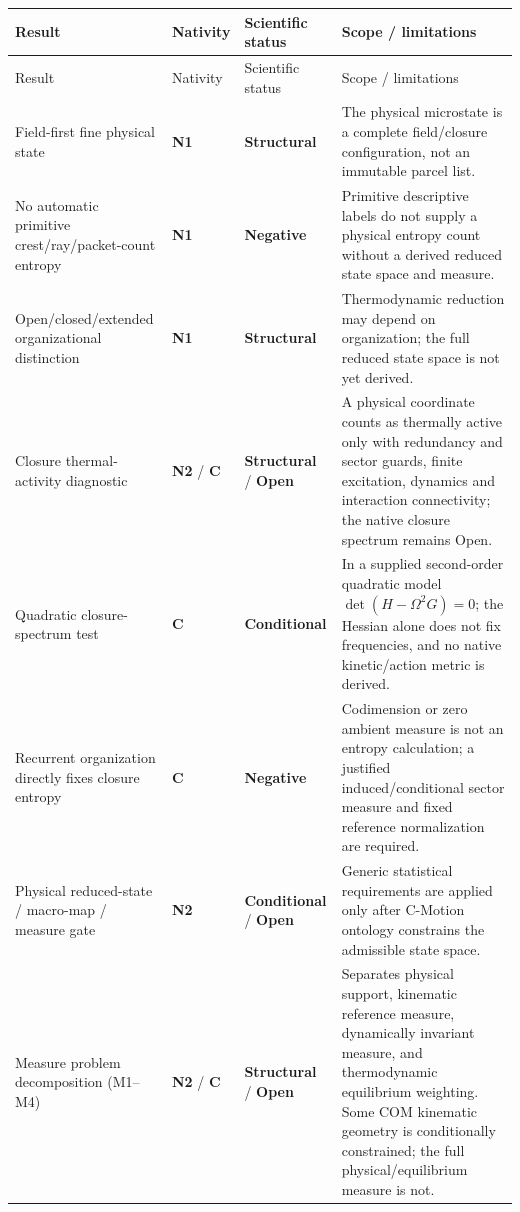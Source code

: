 \documentclass[11pt]{article}
\theoremstyle{definition}
\newcommand{\cmotion}{\mbox{C-Motion}}
\newcommand{\statusStructural}{\textcolor{blue!55!black}{\textbf{Structural}}}
\newcommand{\statusConditional}{\textcolor{yellow!60!black}{\textbf{Conditional}}}
\newcommand{\statusOpen}{\textcolor{red!75!black}{\textbf{Open}}}
\newcommand{\statusNegative}{\textcolor{red!65!black}{\textbf{Negative}}}
\newcommand{\natNOne}{\textcolor{blue!70!black}{\textbf{N1}}}
\newcommand{\natNTwo}{\textcolor{teal!70!black}{\textbf{N2}}}
\newcommand{\natControl}{\textcolor{gray!75!black}{\textbf{C}}}
\begin{document}
\begin{center}
\footnotesize
\renewcommand{\arraystretch}{1.20}
\begin{longtable}{@{}P{3.5cm}P{1.7cm}P{2.5cm}P{5.6cm}@{}}
\toprule
Result & Nativity & Scientific status & Scope / limitations \\
\midrule
\endfirsthead
\toprule
Result & Nativity & Scientific status & Scope / limitations \\
\midrule
\endhead
Field-first fine physical state
& \natNOne{} & \statusStructural{}
& The physical microstate is a complete field/closure configuration, not an immutable parcel list. \\
No automatic primitive crest/ray/packet-count entropy
& \natNOne{} & \statusNegative{}
& Primitive descriptive labels do not supply a physical entropy count without a derived reduced state space and measure. \\
Open/closed/extended organizational distinction
& \natNOne{} & \statusStructural{}
& Thermodynamic reduction may depend on organization; the full reduced state space is not yet derived. \\
Closure thermal-activity diagnostic
& \natNTwo{} / \natControl{} & \statusStructural{} / \statusOpen{}
& A physical coordinate counts as thermally active only with redundancy and sector guards, finite excitation, dynamics and interaction connectivity; the native closure spectrum remains Open. \\
Quadratic closure-spectrum test
& \natControl{} & \statusConditional{}
& In a supplied second-order quadratic model $\det(H-\Omega^2G)=0$; the Hessian alone does not fix frequencies, and no native kinetic/action metric is derived. \\
Recurrent organization directly fixes closure entropy
& \natControl{} & \statusNegative{}
& Codimension or zero ambient measure is not an entropy calculation; a justified induced/conditional sector measure and fixed reference normalization are required. \\
Physical reduced-state / macro-map / measure gate
& \natNTwo{} & \statusConditional{} / \statusOpen{}
& Generic statistical requirements are applied only after \cmotion{} ontology constrains the admissible state space. \\
Measure problem decomposition (M1--M4)
& \natNTwo{} / \natControl{} & \statusStructural{} / \statusOpen{}
& Separates physical support, kinematic reference measure, dynamically invariant measure, and thermodynamic equilibrium weighting.  Some COM kinematic geometry is conditionally constrained; the full physical/equilibrium measure is not. \\

\end{longtable}
\end{center}
\end{document}

